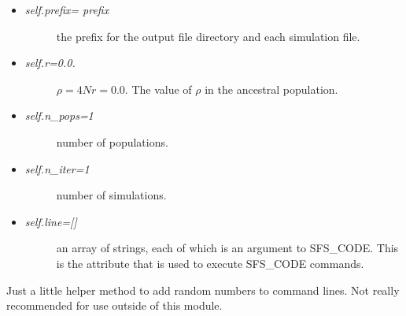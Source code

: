 \documentclass[letterpaper,10pt,english]{sphinxmanual}
\begin{document}
\begin{fulllineitems}
\begin{itemize}
\begin{itemize}
\begin{description}
\end{description}

\item {} \begin{description}
\item[{\emph{self.prefix= prefix} }] \leavevmode
the prefix for the output file directory and each simulation file.

\end{description}

\item {} \begin{description}
\item[{\emph{self.r=0.0.} }] \leavevmode
\(\rho = 4Nr = 0.0\).  The value of \(\rho\) in the 
ancestral population.

\end{description}

\item {} \begin{description}
\item[{\emph{self.n\_pops=1} }] \leavevmode
number of populations.

\end{description}

\item {} \begin{description}
\item[{\emph{self.n\_iter=1} }] \leavevmode
number of simulations.

\end{description}

\item {} \begin{description}
\item[{\emph{self.line={[}{]}} }] \leavevmode
an array of strings, each of which is an argument
to SFS\_CODE.  This is the attribute that is used to execute SFS\_CODE
commands.

\end{description}

\end{itemize}

\end{itemize}

\begin{fulllineitems}
\label{index:command.SFSCommand.add_rand}
Just a little helper method to add random numbers to command lines.
Not really recommended for use outside of this module.


\end{fulllineitems}
\end{fulllineitems}
\end{document}
